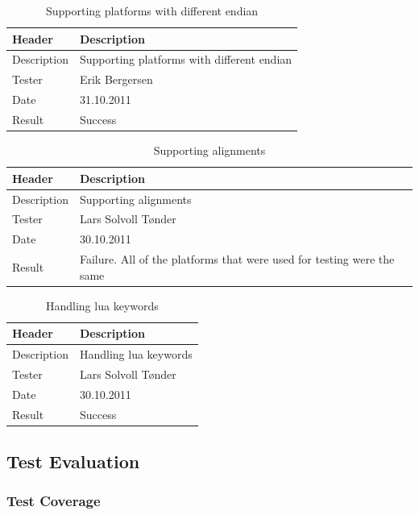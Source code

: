 \begin{table}[!htb] \footnotesize \center
\caption{Supporting platforms with different \gls{endian} \label{tab:sp3TID21}}
\begin{tabular}{l l}
	\toprule
	Header & Description \\
	\midrule
	Description & Supporting platforms with different \gls{endian} \\
	Tester & Erik Bergersen\\
	Date & 31.10.2011\\
	Result & Success\\
	\bottomrule
\end{tabular}
\end{table}

\begin{table}[!htb] \footnotesize \center
\caption{Supporting alignments \label{tab:sp3TID22}}
\begin{tabular}{l l}
	\toprule
	Header & Description \\
	\midrule
	Description & Supporting alignments \\
	Tester & Lars Solvoll Tønder\\
	Date & 30.10.2011\\
	Result & Failure. All of the platforms that were used for testing were the same\\
	\bottomrule
\end{tabular}
\end{table}

\begin{table}[!htb] \footnotesize \center
\caption{Handling \Gls{lua} keywords \label{tab:sp3TID22}}
\begin{tabular}{l l}
	\toprule
	Header & Description \\
	\midrule
	Description & Handling \Gls{lua} keywords \\
	Tester & Lars Solvoll Tønder\\
	Date & 30.10.2011\\
	Result & Success\\
	\bottomrule
\end{tabular}
\end{table}

\subsection{Test Evaluation}

\subsubsection{Test Coverage}


